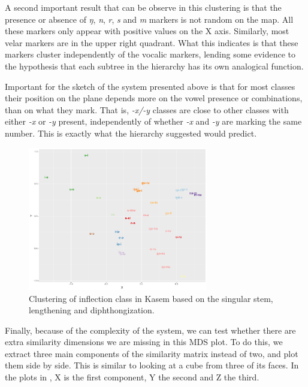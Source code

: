 A second important result that can be observe in this clustering is that the presence or absence of \textit{ŋ}, \textit{n}, \textit{r}, \textit{s} and \textit{m} markers is not random on the map. All these markers only appear with positive values on the X axis. Similarly, most velar markers are in the upper right quadrant. What this indicates is that these markers cluster independently of the vocalic markers, lending some evidence to the hypothesis that each subtree in the hierarchy has its own analogical function.

Important for the sketch of the system presented above is that for most classes their position on the plane depends more on the vowel presence or combinations, than on what they mark. That is, \textit{-x/-y} classes are close to other classes with either \textit{-x} or \textit{-y} present, independently of whether \textit{-x} and \textit{-y} are marking the same number. This is exactly what the hierarchy suggested would predict.

\begin{figure}
  \centering
  \includegraphics[width=0.7\textwidth]{./figures/kasem/kasem-nouns-hclust-sim-sg-pred.pdf}
  \caption{Clustering of inflection class in Kasem based on the singular stem, lengthening and diphthongization.}\label{fig:class-cluster-kasem}
\end{figure}

Finally, because of the complexity of the system, we can test whether there are extra similarity dimensions we are missing in this MDS plot. To do this, we extract three main components of the similarity matrix instead of two, and plot them side by side. This is similar to looking at a cube from three of its faces. In the plots in , X is the first component, Y the second and Z the third.

